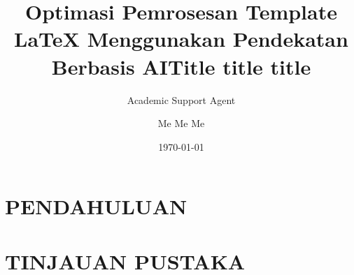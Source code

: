 \documentclass{tikzposter}
\title{Optimasi Pemrosesan Template LaTeX Menggunakan Pendekatan Berbasis AI}
\author{Academic Support Agent}
\date{\today}
\begin{document}
\maketitle

\begin{abstract}

\end{abstract}

\chapter{PENDAHULUAN}


\chapter{TINJAUAN PUSTAKA}







\usepackage{fontspec}
\setmainfont{FreeSerif}
\setsansfont{FreeSans}

\author{Me Me Me}
\title{Title title title}
\end{document}

